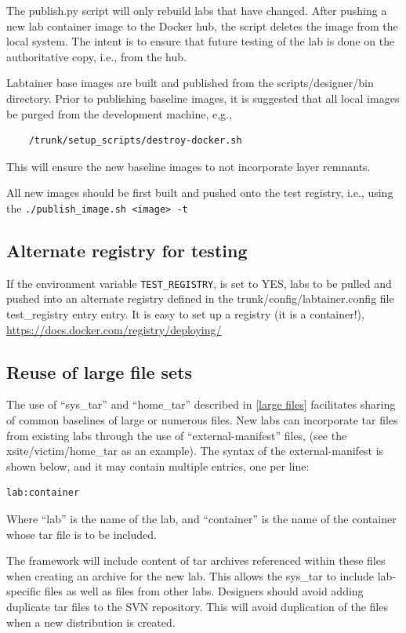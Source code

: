 \documentclass[12pt]{article}
\begin{document}
The publish.py script will only rebuild labs that have changed.  After pushing a new lab container
image to the Docker hub, the script deletes the image from the local system.  The intent is to
ensure that future testing of the lab is done on the authoritative copy, i.e., from the hub.

Labtainer base images are built and published from the scripts/designer/bin directory.  Prior to publishing
baseline images, it is suggested that all local images be purged from the development machine, e,g.,
\begin{verbatim}
    /trunk/setup_scripts/destroy-docker.sh
\end{verbatim}
\noindent This will ensure the new baseline images to not incorporate layer remnants.

All new images should be first built and pushed onto the test registry, i.e., using the 
{\tt ./publish\_image.sh <image> -t}

\subsection{Alternate registry for testing}
If the environment variable {\tt TEST\_REGISTRY}, is set to YES, labs to be pulled and pushed
into an alternate registry defined in the trunk/config/labtainer.config file test\_registry entry entry.
It is easy to set up a registry (it is a container!), \url{https://docs.docker.com/registry/deploying/}

\subsection{Reuse of large file sets}
\label{manifest}
The use of ``sys\_tar'' and ``home\_tar'' described in \ref{large files} facilitates sharing of common
baselines of large or numerous files.  New labs can incorporate tar files from existing
labs through the use of ``external-manifest'' files, (see the xsite/victim/home\_tar as
an example).   The syntax of the external-manifest is shown below, and it may contain
multiple entries, one per line:
\begin{verbatim}
lab:container
\end{verbatim}
\noindent Where ``lab'' is the name of the lab, and ``container'' is the name of the container
whose tar file is to be included.

The framework will include content of tar archives referenced within these files
when creating an archive for the new lab.  This allows the sys\_tar to include lab-specific files
as well as files from other labs.  Designers should avoid adding duplicate tar files to the SVN repository.
This will avoid duplication of the files when a new distribution is created.
\end{document}
